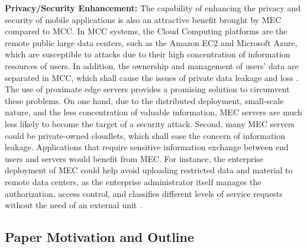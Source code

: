 \documentclass[journal]{IEEEtran}
\begin{document}
\textbf{Privacy/Security Enhancement:} The capability of enhancing the privacy and security of mobile applications is also an attractive benefit brought by MEC compared to MCC. In MCC systems, the Cloud Computing platforms are the remote public large data centers, such as the Amazon EC2 and Microsoft Azure, which are susceptible to attacks due to their high concentration of information resources of users. In addition, the ownership and management of users' data are separated in MCC, which shall cause the issues of private data leakage and loss \cite{HSuoIWCMC13}. The use of proximate edge servers provides a promising solution to circumvent these problems. On one hand, due to the distributed deployment, small-scale nature, and the less concentration of valuable information, MEC servers are much less likely to become the target of a security attack. Second, many MEC servers could be private-owned cloudlets, which shall ease the concern of information leakage. Applications that require sensitive information exchange between end users and servers would  benefit from MEC. For instance, the enterprise deployment of MEC could help avoid uploading restricted data and material to remote data centers, as the enterprise administrator itself manages the authorization, access control, and classifies different levels of service requests without the need of an external unit \cite{ETSI_ServiceScenarios}.


\subsection{Paper Motivation and Outline}
\end{document}
